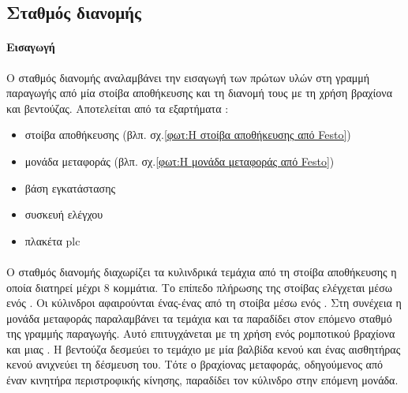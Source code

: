 \documentclass[a4paper,12pt,twoside]{report}
\begin{document}
			\FloatBarrier
			\subsection{Σταθμός διανομής \cite{FestoMPSDistributionStationManual} \cite{ΤοΦυσικόΣύστημαFestoMPS} \cite{UMLΕνσωματωμέναΣυστήματα}}
			
			\label{ενότ:Σταθμός διανομής}
				\paragraph{Εισαγωγή} {Ο σταθμός διανομής αναλαμβάνει την εισαγωγή των πρώτων υλών στη γραμμή παραγωγής από μία στοίβα αποθήκευσης και τη διανομή τους με τη χρήση βραχίονα και βεντούζας. Αποτελείται από τα εξαρτήματα :
				}
				\begin{itemize}
					\item στοίβα αποθήκευσης {\footnotesize (βλπ. σχ.\ref{φωτ:Η στοίβα αποθήκευσης από Festo})}
					\item μονάδα μεταφοράς {\footnotesize (βλπ. σχ.\ref{φωτ:Η μονάδα μεταφοράς από Festo})}
					\item βάση εγκατάστασης
					\item συσκευή ελέγχου
					\item πλακέτα plc
				\end{itemize}
				\paragraph{} {Ο σταθμός διανομής διαχωρίζει τα κυλινδρικά τεμάχια από τη στοίβα αποθήκευσης η οποία διατηρεί μέχρι 8 κομμάτια. Το επίπεδο πλήρωσης της στοίβας ελέγχεται μέσω ενός . Οι κύλινδροι αφαιρούνται ένας-ένας από τη στοίβα μέσω ενός . Στη συνέχεια η \gls{μονάδα μεταφοράς} παραλαμβάνει τα τεμάχια και τα παραδίδει στον επόμενο σταθμό της γραμμής παραγωγής. Αυτό επιτυγχάνεται με τη χρήση ενός ρομποτικού βραχίονα και μιας . Η βεντούζα δεσμεύει το τεμάχιο με μία βαλβίδα κενού και ένας \gls{αισθητήρας κενού} ανιχνεύει τη δέσμευση του. Τότε ο βραχίονας μεταφοράς, οδηγούμενος από έναν κινητήρα περιστροφικής κίνησης, παραδίδει τον κύλινδρο στην επόμενη μονάδα.
				}
				
\end{document}
